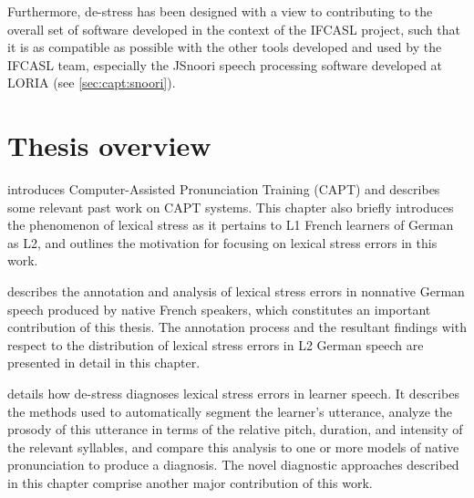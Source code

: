 Furthermore, 
de-stress
 has been designed with a view to contributing to the overall set of software developed in the context of the IFCASL project, such that it is as compatible as possible with the other tools developed and used by the IFCASL team, especially the JSnoori speech processing software developed at LORIA (see \cref{sec:capt:snoori}).




\section{Thesis overview}
\label{sec:intro:overview}


 introduces Computer-Assisted Pronunciation Training (CAPT) 
and describes some relevant past work on CAPT systems. 
This chapter also briefly 
introduces the phenomenon of lexical stress as it pertains to L1 French learners of German as L2, and outlines
the motivation for focusing on lexical stress errors in this work.


describes 
the annotation and analysis of lexical stress errors in 
nonnative German speech produced by native French speakers, which constitutes an important contribution of this thesis. 
The annotation process and the resultant findings with respect to the distribution of lexical stress errors in L2 German speech are presented in detail in this chapter.

 details how de-stress diagnoses lexical stress errors in learner speech. It describes the methods used to automatically segment the learner's utterance, analyze the prosody of this utterance in terms of the relative pitch, duration, and intensity of the relevant syllables, and compare this analysis to one or more models of native pronunciation to produce a diagnosis. The novel diagnostic approaches described in this chapter comprise another major contribution of this work. 

